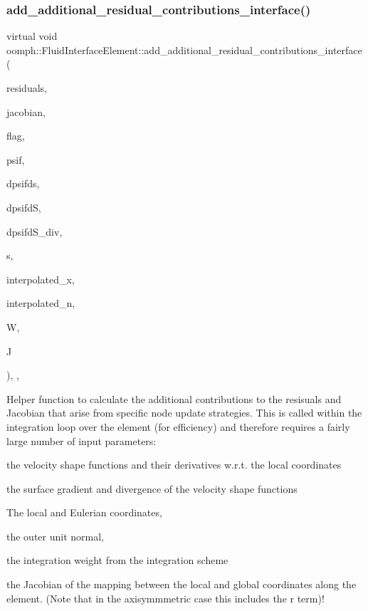 \subsubsection{\texorpdfstring{add\+\_\+additional\+\_\+residual\+\_\+contributions\+\_\+interface()}{add\_additional\_residual\_contributions\_interface()}}
{\footnotesize\ttfamily virtual void oomph\+::\+Fluid\+Interface\+Element\+::add\+\_\+additional\+\_\+residual\+\_\+contributions\+\_\+interface (\begin{DoxyParamCaption}\item[{Vector$<$ double $>$ \&}]{residuals,  }\item[{Dense\+Matrix$<$ double $>$ \&}]{jacobian,  }\item[{const unsigned \&}]{flag,  }\item[{const Shape \&}]{psif,  }\item[{const D\+Shape \&}]{dpsifds,  }\item[{const D\+Shape \&}]{dpsifdS,  }\item[{const D\+Shape \&}]{dpsifd\+S\+\_\+div,  }\item[{const Vector$<$ double $>$ \&}]{s,  }\item[{const Vector$<$ double $>$ \&}]{interpolated\+\_\+x,  }\item[{const Vector$<$ double $>$ \&}]{interpolated\+\_\+n,  }\item[{const double \&}]{W,  }\item[{const double \&}]{J }\end{DoxyParamCaption})\hspace{0.3cm}{\ttfamily [inline]}, {\ttfamily [protected]}, {\ttfamily [virtual]}}



Helper function to calculate the additional contributions to the resisuals and Jacobian that arise from specific node update strategies. This is called within the integration loop over the element (for efficiency) and therefore requires a fairly large number of input parameters\+: 


\begin{DoxyItemize}
\item the velocity shape functions and their derivatives w.\+r.\+t. the local coordinates
\item the surface gradient and divergence of the velocity shape functions
\item The local and Eulerian coordinates,
\item the outer unit normal,
\item the integration weight from the integration scheme
\item the Jacobian of the mapping between the local and global coordinates along the element. (Note that in the axisymmmetric case this includes the r term)! 
\end{DoxyItemize}


